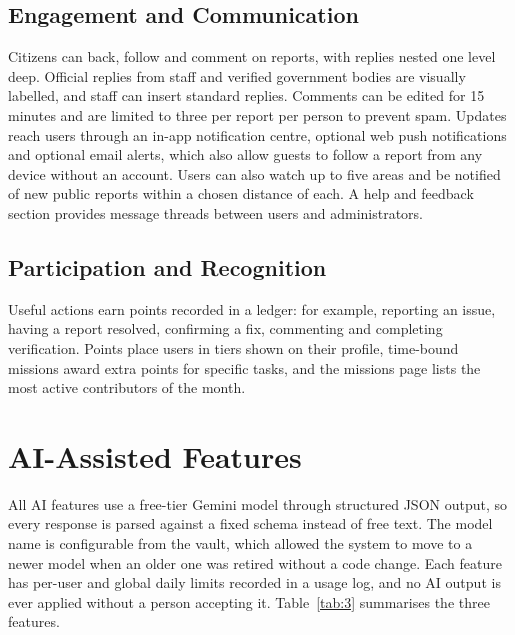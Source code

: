 \documentclass[conference]{IEEEtran}
\begin{document}
\subsection{Engagement and Communication}
Citizens can back, follow and comment on reports, with replies nested one level deep. Official replies from staff and verified government bodies are visually labelled, and staff can insert standard replies. Comments can be edited for 15 minutes and are limited to three per report per person to prevent spam. Updates reach users through an in-app notification centre, optional web push notifications and optional email alerts, which also allow guests to follow a report from any device without an account. Users can also watch up to five areas and be notified of new public reports within a chosen distance of each. A help and feedback section provides message threads between users and administrators.

\subsection{Participation and Recognition}
Useful actions earn points recorded in a ledger: for example, reporting an issue, having a report resolved, confirming a fix, commenting and completing verification. Points place users in tiers shown on their profile, time-bound missions award extra points for specific tasks, and the missions page lists the most active contributors of the month.

\section{AI-Assisted Features}
All AI features use a free-tier Gemini model \cite{b14} through structured JSON output, so every response is parsed against a fixed schema instead of free text. The model name is configurable from the vault, which allowed the system to move to a newer model when an older one was retired without a code change. Each feature has per-user and global daily limits recorded in a usage log, and no AI output is ever applied without a person accepting it. Table~\ref{tab:3} summarises the three features.
\end{document}
